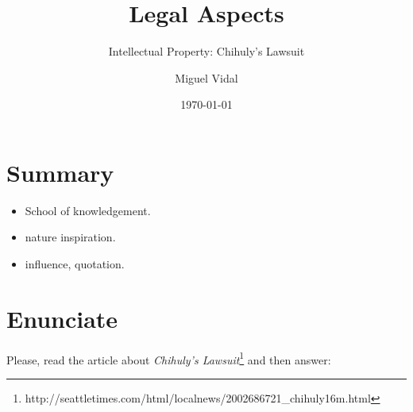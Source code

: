 \documentclass[11pt]{scrartcl}
\title{\textbf{Legal Aspects}}
\subtitle{Intellectual Property: Chihuly's Lawsuit}
\author{Miguel Vidal}
\date{\today}
\begin{document}
\maketitle

\section{Summary}

\begin{itemize}

	\item School of knowledgement.
	\item nature inspiration.
	\item influence, quotation.
\end{itemize}

\section{Enunciate}

Please, read the article about \emph{Chihuly's Lawsuit}\footnote{http://seattletimes.com/html/localnews/2002686721\_chihuly16m.html} and then answer:
\end{document}
